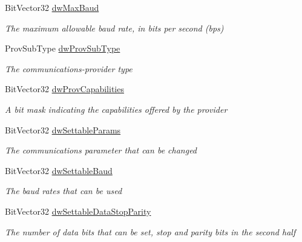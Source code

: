 \begin{DoxyCompactItemize}
Bit\+Vector32 \mbox{\hyperlink{struct_r_j_c_p_1_1_i_o_1_1_ports_1_1_native_1_1_windows_1_1_native_methods_1_1_comm_prop_a651e9836aff0866270a637334e31c3b2}{dw\+Max\+Baud}}
\begin{DoxyCompactList}\small\item\em The maximum allowable baud rate, in bits per second (bps) \end{DoxyCompactList}\item 
Prov\+Sub\+Type \mbox{\hyperlink{struct_r_j_c_p_1_1_i_o_1_1_ports_1_1_native_1_1_windows_1_1_native_methods_1_1_comm_prop_a10c6548bf288f9f58ded370d103fea22}{dw\+Prov\+Sub\+Type}}
\begin{DoxyCompactList}\small\item\em The communications-\/provider type \end{DoxyCompactList}\item 
Bit\+Vector32 \mbox{\hyperlink{struct_r_j_c_p_1_1_i_o_1_1_ports_1_1_native_1_1_windows_1_1_native_methods_1_1_comm_prop_a9871f8b1addd6daebc87bb2b86e058cc}{dw\+Prov\+Capabilities}}
\begin{DoxyCompactList}\small\item\em A bit mask indicating the capabilities offered by the provider \end{DoxyCompactList}\item 
Bit\+Vector32 \mbox{\hyperlink{struct_r_j_c_p_1_1_i_o_1_1_ports_1_1_native_1_1_windows_1_1_native_methods_1_1_comm_prop_a9a656bcec6b0ffb1176d72586a154401}{dw\+Settable\+Params}}
\begin{DoxyCompactList}\small\item\em The communications parameter that can be changed \end{DoxyCompactList}\item 
Bit\+Vector32 \mbox{\hyperlink{struct_r_j_c_p_1_1_i_o_1_1_ports_1_1_native_1_1_windows_1_1_native_methods_1_1_comm_prop_ae4f5b82a8a5c361dcf472261d7308c25}{dw\+Settable\+Baud}}
\begin{DoxyCompactList}\small\item\em The baud rates that can be used \end{DoxyCompactList}\item 
Bit\+Vector32 \mbox{\hyperlink{struct_r_j_c_p_1_1_i_o_1_1_ports_1_1_native_1_1_windows_1_1_native_methods_1_1_comm_prop_a050f4e4326571ae732ddf7ba2cdad533}{dw\+Settable\+Data\+Stop\+Parity}}
\begin{DoxyCompactList}\small\item\em The number of data bits that can be set, stop and parity bits in the second half \end{DoxyCompactList}\item 

\end{DoxyCompactItemize}
